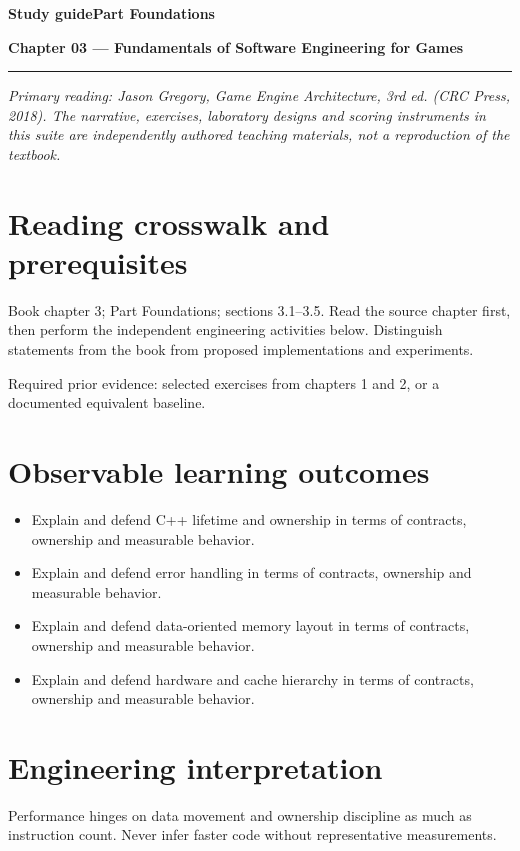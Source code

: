 \documentclass[11pt,letterpaper]{article}
\newcommand{\DocType}{Reference}
\newcommand{\SuiteHeading}[3]{%
\renewcommand{\DocType}{#2}%
{\small\bfseries\sffamily\color{EngineTeal}#2\hfill #3}\par\vspace{6pt}
{\LARGE\bfseries\color{EngineBlue}#1}\par\vspace{4pt}
{\color{EngineTeal}\rule{\linewidth}{1pt}}\par\vspace{7pt}}
\newcommand{\SourceNote}{\footnotesize\textit{Primary reading: Jason Gregory, \emph{Game Engine Architecture}, 3rd ed. (CRC Press, 2018). The narrative, exercises, laboratory designs and scoring instruments in this suite are independently authored teaching materials, not a reproduction of the textbook.}\normalsize\par}
\begin{document}
\SuiteHeading{Chapter 03 — Fundamentals of Software Engineering for Games}{Study guide}{Part Foundations}
\SourceNote
\section{Reading crosswalk and prerequisites}
Book chapter 3; Part Foundations; sections 3.1--3.5. Read the source chapter first, then perform the independent engineering activities below. Distinguish statements from the book from proposed implementations and experiments.

Required prior evidence: selected exercises from chapters 1 and 2, or a documented equivalent baseline.

\section{Observable learning outcomes}
\begin{itemize}
\item Explain and defend C++ lifetime and ownership in terms of contracts, ownership and measurable behavior.
\item Explain and defend error handling in terms of contracts, ownership and measurable behavior.
\item Explain and defend data-oriented memory layout in terms of contracts, ownership and measurable behavior.
\item Explain and defend hardware and cache hierarchy in terms of contracts, ownership and measurable behavior.
\end{itemize}
\section{Engineering interpretation}
Performance hinges on data movement and ownership discipline as much as instruction count. Never infer faster code without representative measurements.
\end{document}
